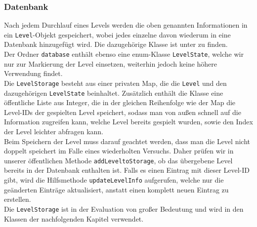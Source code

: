 \subsubsection{Datenbank}
Nach jedem Durchlauf eines Levels werden die oben genannten Informationen in ein \texttt{Level}-Objekt gespeichert, wobei jedes einzelne davon wiederum in eine Datenbank hinzugefügt wird. Die dazugehörige Klasse ist unter  zu finden. \\
Der Ordner \texttt{database} enthält ebenso eine enum-Klasse \texttt{LevelState}, welche wir nur zur Markierung der Level einsetzen, weiterhin jedoch keine höhere Verwendung findet. \\ 
Die \texttt{LevelStorage} besteht aus einer privaten Map, die die \texttt{Level} und den dazugehörigen \texttt{LevelState} beinhaltet. Zusätzlich enthält die Klasse eine öffentliche Liste aus Integer, die in der gleichen Reihenfolge wie der Map die Level-IDs der gespielten Level speichert, sodass man von au\ss en schnell auf die Information zugreifen kann, welche Level bereits gespielt wurden, sowie den Index der Level leichter abfragen kann. \\
Beim Speichern der Level muss darauf geachtet werden, dass man die Level nicht doppelt speichert im Falle eines wiederholten Versuchs. Daher prüfen wir in unserer öffentlichen Methode \texttt{addLeveltoStorage}, ob das übergebene Level bereits in der Datenbank enthalten ist. Falls es einen Eintrag mit dieser Level-ID gibt, wird die Hilfsmethode \texttt{updateLevelInfo} aufgerufen, welche nur die geänderten Einträge aktualisiert, anstatt einen komplett neuen Eintrag zu erstellen. \\
Die \texttt{LevelStorage} ist in der Evaluation von gro\ss er Bedeutung und wird in den Klassen der nachfolgenden Kapitel verwendet.

